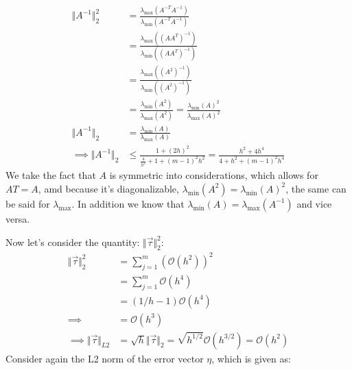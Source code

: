 \documentclass[]{article}
\begin{document}
        \begin{align*}\tag{2.b.3}\label{eqn:2.b.3}
            \Vert A^{-1}\Vert_2^2 &= 
            \frac{
                    \lambda_{\max}(A^{-T}A^{-1})
                }{
                    \lambda_{\min}(A^{-T}A^{-1})
                }
            \\
            &= \frac{
                \lambda_{\max}((AA^T)^{-1})
            }{
                \lambda_{\min}((AA^T)^{-1})
            }
            \\
            &= 
            \frac{\lambda_{\max}((A^2)^{-1})}
            {\lambda_{\min}((A^2)^{-1})}
            \\
            &= 
            \frac{\lambda_{\min}(A^2)}{\lambda_{\max}(A^2)} = 
            \frac{\lambda_{\min}(A)^2}{\lambda_{\max}(A)^2}
            \\
            \Vert A^{-1}\Vert_2 &= 
            \frac{\lambda_{\min}(A)}{\lambda_{\max}(A)}
            \\
            \implies 
            \Vert A^{-1}\Vert_2 &\le 
            \frac{1 + (2h)^2}{\frac{4}{h^2} + 1 + (m - 1)^2h^2}
            = 
            \frac{h^2 + 4h^4}{
                4 + h^2 + (m - 1)^2h^4
            }
        \end{align*}
        We take the fact that $A$ is symmetric into considerations, which allows for $AT = A$, amd because it's diagonalizable, $\lambda_{\min}(A^2) = \lambda_{\min}(A)^2$, the same can be said for $\lambda_{\max}$. In addition we know that $\lambda_{\min}(A) = \lambda_{\max}(A^{-1})$ and vice versa. 
        \par
        Now let's consider the quantity: $\Vert \vec{\tau}\Vert_2^2$: 
        \begin{align*}\tag{2.b.4}\label{eqn:2.b.4}
            \Vert \vec{\tau}\Vert_2^2 &= 
            \sum_{j = 1}^{m} (\mathcal{O}(h^2))^2
            \\
            &= \sum_{j = 1}^{m}
            \mathcal{O}(h^4)
            \\
            &= (1/h - 1)\mathcal{O}(h^4)
            \\
            \implies &= \mathcal{O}(h^3)
            \\
            \implies
            \Vert \vec{\tau}\Vert_{L2} &= \sqrt{h}\Vert \vec{\tau}\Vert_2
            = \sqrt{h^{1/2}}\mathcal{O}(h^{3/2}) = \mathcal{O}(h^2)
        \end{align*}
        Consider again the L2 norm of the error vector $\eta$, which is given as: 
\end{document}
